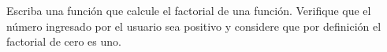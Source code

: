 \begin{code} Escriba una función que calcule el factorial de una
función. Verifique que el número ingresado por el usuario sea positivo y
considere que por definición el factorial de cero es uno.

\begin{Shaded}
\begin{Highlighting}[]
        \OperatorTok{\textgreater{}=}\NormalTok{:}
\OperatorTok{=}
        \OperatorTok{\textgreater{}}\NormalTok{:}
\OperatorTok{=}
             \NormalTok{(}\OperatorTok{+}\NormalTok{):}
\OperatorTok{=}\OperatorTok{*}
        \NormalTok{:}
            \NormalTok{(}\NormalTok{)}

\OperatorTok{=} \NormalTok{(}\NormalTok{(}\NormalTok{))}
    \NormalTok{(}\SpecialCharTok{\{}\SpecialCharTok{\}}\SpecialStringTok{! = }\SpecialCharTok{\{}\SpecialCharTok{\}}\SpecialStringTok{\textquotesingle{}}\NormalTok{)      }

\end{Highlighting}
\end{Shaded}
\end{code}


